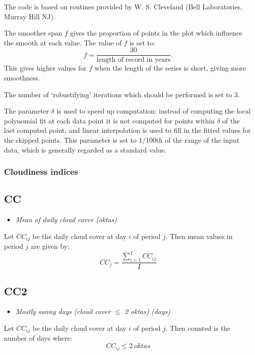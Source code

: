 \documentclass[a4paper,11pt]{article}
\begin{document}
The code is based on routines provided by W. S. Cleveland (Bell Laboratories, Murray Hill NJ).

The smoother span $f$ gives the proportion of points in the plot which influence
the smooth at each value. The value of $f$ is set to:
\begin{equation*}
f = {\frac{30}{\text{length of record in years}}}.
\end{equation*}
This gives higher values for $f$ when the length of the series is short, giving more smoothness.

The number of `robustifying' iterations which should be performed is set to 3.

The parameter $\delta$ is used to speed up computation: instead of computing the local polynomial fit at each data
point it is not computed for points within $\delta$ of the last computed point, and linear interpolation
is used to fill in the fitted values for the skipped points.
This parameter is set to 1/100th of the range of the input data, which is generally regarded as a standard value.

\subsubsection{Cloudiness indices}

\subsection*{CC}
\begin{itemize}
\item \textit{Mean of daily cloud cover (oktas)}
\end{itemize}
Let $CC_{ij}$ be the daily cloud cover at day $i$ of period
$j$. Then mean values in period $j$ are given by:
\begin{equation*}
CC_{j} = \frac{\sum_{i=1}^{I} CC_{ij}}{I}
\end{equation*}

\subsection*{CC2}
\begin{itemize}
\item \textit{Mostly sunny days (cloud cover $\leq$ 2 oktas) (days)}
\end{itemize}
Let $CC_{ij}$ be the daily cloud cover at day $i$ of period
$j$. Then counted is the number of days where:
\begin{equation*}
CC_{ij} \leq 2 \:oktas
\end{equation*}
\end{document}
